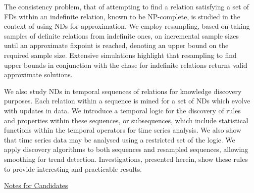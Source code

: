 \documentclass[12pt]{article}
\begin{document}
The consistency
problem, that of attempting to find a relation satisfying a set of FDs
within an indefinite relation, known to be
NP-complete, is studied in the context of using NDs for approximation.
We employ resampling, based on taking samples of definite
relations from indefinite ones, on incremental
sample sizes until an approximate fixpoint is
reached, denoting an upper bound on the required sample
size. Extensive simulations highlight that resampling
to find upper bounds in conjunction with the chase for
indefinite relations returns valid approximate solutions.

\medskip

We also study NDs in temporal sequences of relations for knowledge
discovery purposes. Each relation within a sequence is mined for a set of NDs
which evolve with updates in data. We introduce a temporal logic for the
discovery of rules and properties within these sequences, or
subsequences, which
include statistical functions within the temporal operators for
time series analysis. We also show that time series data may be analysed
using a restricted set of the logic.
We apply discovery algorithms to both
sequences and resampled sequences, allowing smoothing for trend
detection. Investigations, presented herein, show these rules to
provide interesting and practicable results.

\newpage

\underline{Notes for Candidates} \newline
\end{document}

